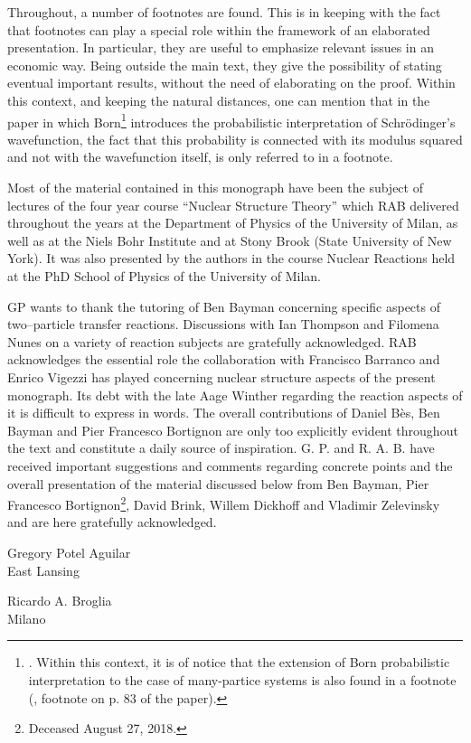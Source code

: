 Throughout, a number of footnotes are found. This is in keeping with the fact that footnotes can play a special role within the framework of an elaborated presentation. In particular, they are useful to emphasize relevant issues in an economic way. Being outside the main text, they give the possibility of stating eventual important results, without the need of elaborating on the proof. Within this context, and keeping the natural distances, one can mention that in the paper  in which Born\footnote{\cite{Born:26}. Within this context, it is of notice that the extension of Born probabilistic interpretation to the case of many-partice systems is also found in a footnote (\cite{Pauli:27}, footnote on p. 83 of the paper).} introduces the probabilistic interpretation of Schr\"odinger's  wavefunction, the fact that this probability is connected with its modulus squared and not with the wavefunction itself, is only referred to in a footnote.



  Most of the material contained in this monograph have been the subject of lectures of the four year course ``Nuclear Structure Theory'' which RAB delivered throughout the years at the Department of Physics of the University of Milan, as well as at the Niels Bohr Institute and at Stony Brook (State University of New York). It was also presented by the authors in the course Nuclear Reactions held at the PhD School of Physics of the University of Milan.

GP wants to thank the tutoring of  Ben Bayman concerning specific aspects of two--particle transfer reactions. Discussions with Ian Thompson and Filomena Nunes on a variety of reaction subjects are gratefully acknowledged. 
RAB  acknowledges the essential role the collaboration with Francisco Barranco and Enrico Vigezzi has played concerning  nuclear structure aspects of the present monograph. Its debt with the late Aage Winther regarding the reaction aspects of it is difficult to express in words. The overall contributions of Daniel B\`{e}s, Ben Bayman and Pier Francesco Bortignon are only too explicitly evident throughout the text and constitute a daily source of inspiration.  G. P. and R. A. B. have received important suggestions and comments regarding concrete points and the overall presentation of the material discussed below from Ben Bayman, Pier Francesco Bortignon\footnote{Deceased August 27, 2018.}, David Brink, Willem Dickhoff and Vladimir Zelevinsky and are here gratefully acknowledged.
\begin{flushleft}
Gregory Potel Aguilar\\
 East Lansing
\end{flushleft}
\vspace{-1.7cm}
\begin{flushright}
Ricardo A. Broglia\\
 Milano
\end{flushright}



% 
 
